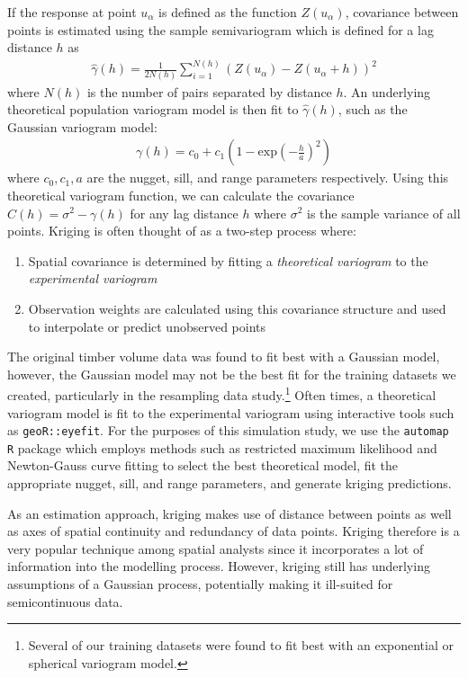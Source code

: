 \documentclass{article}
\begin{document}
If the response at point $u_\alpha$ is defined as the function $Z(u_\alpha)$, covariance between points is estimated using the sample semivariogram which is defined for a lag distance $h$ as
\begin{align*}
	\hat{\gamma}(h) = \frac{1}{2 N(h)} \sum_{i=1}^{N(h)} (Z(u_{\alpha}) - Z(u_{\alpha} + h))^2
\end{align*}
where $N(h)$ is the number of pairs separated by distance $h$.
An underlying theoretical population variogram model is then fit to $\hat{\gamma}(h)$, such as the Gaussian variogram model:
\begin{align*}
	\gamma(h) = c_0 + c_1 \left( 1 - \text{exp}\left(-\frac{h}{a}\right)^2\right)
\end{align*}
where $c_0, c_1, a$ are the nugget, sill, and range parameters respectively.\cite{cressie93}
Using this theoretical variogram function, we can calculate the covariance $C(h) = \sigma^2 - \gamma(h)$ for any lag distance $h$ where $\sigma^2$ is the sample variance of all points. Kriging is often thought of as a two-step process where:
\begin{enumerate}
	\item Spatial covariance is determined by fitting a \textit{theoretical variogram} to the \textit{experimental variogram}
	\item Observation weights are calculated using this covariance structure and used to interpolate or predict unobserved points
\end{enumerate}

The original timber volume data was found to fit best with a Gaussian model, however, the Gaussian model may not be the best fit for the training datasets we created, particularly in the resampling data study.\footnote{Several of our training datasets were found to fit best with an exponential or spherical variogram model.}
Often times, a theoretical variogram model is fit to the experimental variogram using interactive tools such as \texttt{geoR::eyefit}. 
For the purposes of this simulation study, we use the \texttt{automap R} package which employs methods such as restricted maximum likelihood and Newton-Gauss curve fitting to select the best theoretical model, fit the appropriate nugget, sill, and range parameters, and generate kriging predictions.

As an estimation approach, kriging makes use of distance between points as well as axes of spatial continuity and redundancy of data points.
Kriging therefore is a very popular technique among spatial analysts since it incorporates a lot of information into the modelling process.
However, kriging still has underlying assumptions of a Gaussian process, potentially making it ill-suited for semicontinuous data.
\end{document}
